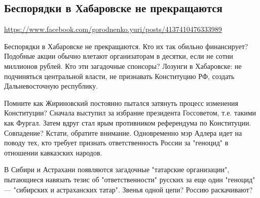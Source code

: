  
 

\subsection{Беспорядки в Хабаровске не прекращаются}
\label{sec:19_07_2020.fb.gorodnenko_yuri}
\url{https://www.facebook.com/gorodnenko.yuri/posts/4137410476333989}
  
Беспорядки в Хабаровске не прекращаются. Кто их так обильно финансирует?
Подобные акции обычно влетают организаторам в десятки, если не сотни миллионов
рублей. Кто эти загадочные спонсоры?  Лозунги в Хабаровске: не подчиняться
центральной власти, не признавать Конституцию РФ, создать Дальневосточную
республику.

Помните как Жириновский постоянно пытался затянуть процесс изменения
Конституции? Сначала выступил за избрание президента Госсоветом, т.е. такими
как Фургал.  Затем вдруг стал ярым противником референдума по Конституции.
Совпадение?  Кстати, обратите внимание. Одновременно мэр Адлера идет на поводу
тех, кто требует признать ответственность России за "геноцид" в отношении
кавказских народов.

В Сибири и Астрахани появляются загадочные "татарские организации", пытающиеся
навязать тезис об "ответственности" русских за еще один "геноцид" --- "сибирских
и астраханских татар".  Звенья одной цепи? Россию раскачивают?
  

